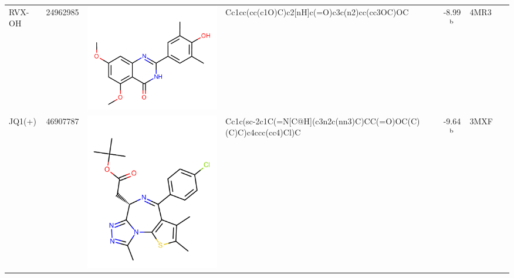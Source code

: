 \documentclass[aps,pre,twocolumn,nofootinbib,superscriptaddress,10pt, final,tightenlines]{revtex4-1}
\begin{document}
\begin{table}
\begin{center}
\begin{tabular}{llp{2cm}>{\ttfamily}lS[table-format=-1.2, table-figures-uncertainty=1]ll}
RVX-OH                       & 24962985                                    & \parbox[c]{1em}{\includegraphics[scale=0.15]{figures/new-bromo/RVX-OH.pdf}}   & Cc1cc(cc(c1O)C)c2[nH]c(=O)c3c(n2)cc(cc3OC)OC                     & -8.99$^{\rm b}$                               & 4MR3~\cite{Picaud:2013:PNAS}               & \cite{Picaud:2013:PNAS}                 \\ 
JQ1(+)                       & 46907787                               & \parbox[c]{1em}{\includegraphics[scale=0.15]{figures/new-bromo/46907787.pdf}} & Cc1c(sc-2c1C(=N[C@H](c3n2c(nn3)C)CC(=O)OC(C)(C)C)c4ccc(cc4)Cl)C  & -9.64$^{\rm b}$                               & 3MXF~\cite{Filippakopoulos:2010:Nature}    & \cite{Filippakopoulos:2010:Nature}      \\ 

\end{tabular}
\end{center}
\end{table}
\end{document}
